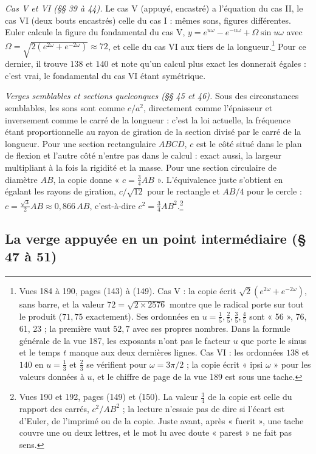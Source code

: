 \documentclass[11pt,a4paper]{article}
\begin{document}
\emph{Cas V et VI (§§ 39 à 44).} Le cas V (appuyé, encastré) a l'équation du cas II, le cas VI (deux bouts encastrés) celle du cas I : mêmes sons, figures différentes. Euler calcule la figure du fondamental du cas V, $y=e^{u\omega}-e^{-u\omega}+\Omega\sin u\omega$ avec $\Omega=\sqrt{2(e^{2\omega}+e^{-2\omega})}\approx72$, et celle du cas VI aux tiers de la longueur.\footnote{Vues 184 à 190, pages (143) à (149). Cas V : la copie écrit $\surd2(e^{2\omega}+e^{-2\omega})$, sans barre, et la valeur $72=\sqrt{2\times2576}$ montre que le radical porte sur tout le produit ($71{,}75$ exactement). Ses ordonnées en $u=\frac15,\frac25,\frac35,\frac45$ sont « 56 », 76, 61, 23 ; la première vaut $52{,}7$ avec ses propres nombres. Dans la formule générale de la vue 187, les exposants n'ont pas le facteur $u$ que porte le sinus et le temps $t$ manque aux deux dernières lignes. Cas VI : les ordonnées $138$ et $140$ en $u=\frac13$ et $\frac23$ se vérifient pour $\omega=3\pi/2$ ; la copie écrit « ipsi $\omega$ » pour les valeurs données à $u$, et le chiffre de page de la vue 189 est sous une tache.} Pour ce dernier, il trouve $138$ et $140$ et note qu'un calcul plus exact les donnerait égales : c'est vrai, le fondamental du cas VI étant symétrique.

\emph{Verges semblables et sections quelconques (§§ 45 et 46).} Sous des circonstances semblables, les sons sont comme $c/a^2$, directement comme l'épaisseur et inversement comme le carré de la longueur : c'est la loi actuelle, la fréquence étant proportionnelle au rayon de giration de la section divisé par le carré de la longueur. Pour une section rectangulaire $ABCD$, $c$ est le côté situé dans le plan de flexion et l'autre côté n'entre pas dans le calcul : exact aussi, la largeur multipliant à la fois la rigidité et la masse. Pour une section circulaire de diamètre $AB$, la copie donne « $c=\frac34AB$ ». L'équivalence juste s'obtient en égalant les rayons de giration, $c/\sqrt{12}$ pour le rectangle et $AB/4$ pour le cercle : $c=\frac{\sqrt3}{2}AB\approx0{,}866\,AB$, c'est-à-dire $c^2=\frac34AB^2$.\footnote{Vues 190 et 192, pages (149) et (150). La valeur $\frac34$ de la copie est celle du rapport des carrés, $c^2/AB^2$ ; la lecture n'essaie pas de dire si l'écart est d'Euler, de l'imprimé ou de la copie. Juste avant, après « fuerit », une tache couvre une ou deux lettres, et le mot lu avec doute « parest » ne fait pas sens.}

\subsection*{La verge appuyée en un point intermédiaire (§ 47 à 51)}
\end{document}
